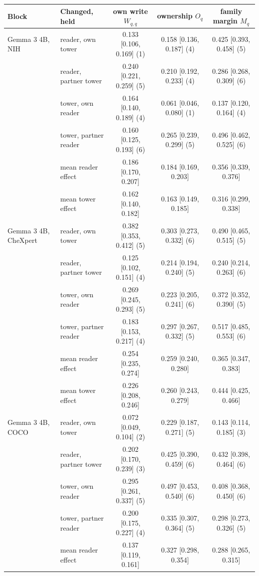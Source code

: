 \documentclass{article}
\begin{document}
\begin{table}[htbp]
{{{\begin{tabular}{llccc}
\midrule
Block & Changed, held & own write $W_{q,q}$ & ownership $O_q$ & family margin $M_q$ \\
\midrule
Gemma 3 4B, NIH & reader, own tower & 0.133 [0.106, 0.169] (1) & 0.158 [0.136, 0.187] (4) & 0.425 [0.393, 0.458] (5) \\
 & reader, partner tower & 0.240 [0.221, 0.259] (5) & 0.210 [0.192, 0.233] (4) & 0.286 [0.268, 0.309] (6) \\
 & tower, own reader & 0.164 [0.140, 0.189] (4) & 0.061 [0.046, 0.080] (1) & 0.137 [0.120, 0.164] (4) \\
 & tower, partner reader & 0.160 [0.125, 0.193] (6) & 0.265 [0.239, 0.299] (5) & 0.496 [0.462, 0.525] (6) \\
 & \quad mean reader effect & 0.186 [0.170, 0.207] & 0.184 [0.169, 0.203] & 0.356 [0.339, 0.376] \\
 & \quad mean tower effect & 0.162 [0.140, 0.182] & 0.163 [0.149, 0.185] & 0.316 [0.299, 0.338] \\
\addlinespace
Gemma 3 4B, CheXpert & reader, own tower & 0.382 [0.353, 0.412] (5) & 0.303 [0.273, 0.332] (6) & 0.490 [0.465, 0.515] (5) \\
 & reader, partner tower & 0.125 [0.102, 0.151] (4) & 0.214 [0.194, 0.240] (5) & 0.240 [0.214, 0.263] (6) \\
 & tower, own reader & 0.269 [0.245, 0.293] (5) & 0.223 [0.205, 0.241] (6) & 0.372 [0.352, 0.390] (5) \\
 & tower, partner reader & 0.183 [0.153, 0.217] (4) & 0.297 [0.267, 0.332] (5) & 0.517 [0.485, 0.553] (6) \\
 & \quad mean reader effect & 0.254 [0.235, 0.274] & 0.259 [0.240, 0.280] & 0.365 [0.347, 0.383] \\
 & \quad mean tower effect & 0.226 [0.208, 0.246] & 0.260 [0.243, 0.279] & 0.444 [0.425, 0.466] \\
\addlinespace
Gemma 3 4B, COCO & reader, own tower & 0.072 [0.049, 0.104] (2) & 0.229 [0.187, 0.271] (5) & 0.143 [0.114, 0.185] (3) \\
 & reader, partner tower & 0.202 [0.170, 0.239] (3) & 0.425 [0.390, 0.459] (6) & 0.432 [0.398, 0.464] (6) \\
 & tower, own reader & 0.295 [0.261, 0.337] (5) & 0.497 [0.453, 0.540] (6) & 0.408 [0.368, 0.450] (6) \\
 & tower, partner reader & 0.200 [0.175, 0.227] (4) & 0.335 [0.307, 0.364] (5) & 0.298 [0.273, 0.326] (5) \\
 & \quad mean reader effect & 0.137 [0.119, 0.161] & 0.327 [0.298, 0.354] & 0.288 [0.265, 0.315] \\

\end{tabular}}}}
\end{table}
\end{document}
